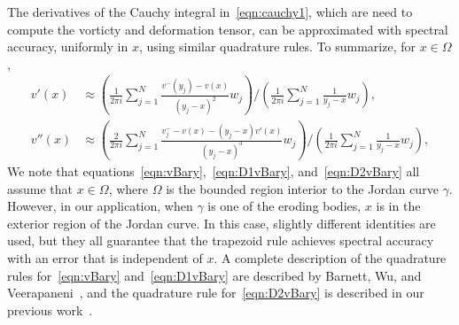 \documentclass[3p]{elsarticle}
\newcommand{\edit}[1]{{\color{red} #1}}
\begin{document}
\begin{appendices}
The derivatives of the Cauchy integral in~\eqref{eqn:cauchy1},
\edit{which are need to compute the vorticty and deformation tensor,}
can be approximated with spectral accuracy, uniformly in $x$, using
similar quadrature rules. To summarize, for $x \in \Omega$, 
\begin{align}
  v'(x) &\approx \left(\frac{1}{2\pi i}\sum_{j=1}^{N}
    \frac{v^{-}(y_j) - v(x)}{(y_j-x)^2} w_j \right)
  \Bigg/
  \left(\frac{1}{2\pi i}\sum_{j=1}^{N} \frac{1}{y_j-x} w_j\right), 
  \label{eqn:D1vBary} \\
  v''(x) &\approx \left(\frac{2}{2\pi i}\sum_{j=1}^N 
    \frac{v^{-}_{j} - v(x) - (y_j-x)v'(x)}{(y_j-x)^3}w_j \right)
    \Bigg/
    \left(\frac{1}{2\pi i}\sum_{j=1}^N \frac{1}{y_j-x}w_j\right),
  \label{eqn:D2vBary}
\end{align}
We note that equations~\eqref{eqn:vBary},~\eqref{eqn:D1vBary},
and~\eqref{eqn:D2vBary} all assume that $x \in \Omega$, where $\Omega$
is the bounded region interior to the Jordan curve $\gamma$. However, in
our application, when $\gamma$ is one of the eroding bodies, $x$ is in
the exterior region of the Jordan curve. In this case, slightly
different identities are used, but they all guarantee that the trapezoid
rule achieves spectral accuracy with an error that is independent of
$x$. A complete description of the quadrature rules
for~\eqref{eqn:vBary} and~\eqref{eqn:D1vBary} are described by Barnett,
Wu, and Veerapaneni~\cite{bar-wu-vee2015}, and the quadrature rule
for~\eqref{eqn:D2vBary} is described in our previous
work~\cite{chiu2020viscous}.





\end{appendices}
\end{document}

